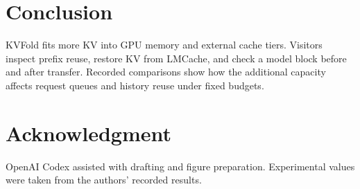 \documentclass[conference]{IEEEtran}
\begin{document}
\section{Conclusion}
KVFold fits more KV into GPU memory and external cache tiers. Visitors
inspect prefix reuse, restore KV from LMCache, and check a model block
before and after transfer. Recorded comparisons show how the additional
capacity affects request queues and history reuse under fixed budgets.

\section*{Acknowledgment}
OpenAI Codex assisted with drafting and figure preparation. Experimental
values were taken from the authors' recorded results.



\end{document}

